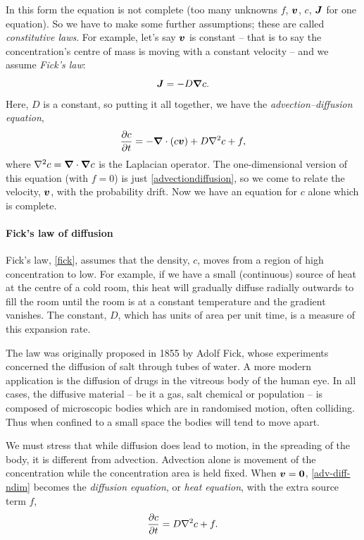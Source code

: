 \documentclass[main.tex]{subfiles}
\begin{document}
In this form the equation is not complete (too many unknowns $f$, $\v{v}$, $c$, $\v{J}$ for one equation). So we have to make some further assumptions; these are called \emph{constitutive laws}. For example, let's say $\v{v}$ is constant -- that is to say the concentration's centre of mass is moving with a constant velocity -- and we assume \emph{Fick's law}:
\begin{equation}
\label{fick}
\v{J} = -D\vgrad c.
\end{equation}
Here, $D$ is a constant, so putting it all together, we have the \emph{advection--diffusion equation},
\begin{equation}
\pd{c}{t} = -\vgrad\cdot(c\v{v})  + D\nabla^2 c + f,
\label{adv-diff-ndim}
\end{equation}
where $\nabla^2 c = \boldsymbol{\nabla} \cdot \boldsymbol{\nabla} c$ is the Laplacian operator. The one-dimensional version of this equation (with $f=0$) is just \cref{advectiondiffusion}, so we come to relate the velocity, $\v{v}$, with the probability drift. Now we have an equation for $c$ alone which is complete.

\begin{info}
\paragraph{Fick's law of diffusion} 
Fick's law, \cref{fick}, assumes that the density, $c$, moves from a region of high concentration to low. For example, if we have a small (continuous) source of heat at the centre of a cold room, this heat will gradually diffuse radially outwards to fill the room until the room is at a constant temperature and the gradient vanishes. The constant, $D$, which has units of area per unit time, is a measure of this expansion rate. 

The law was originally proposed in 1855 by Adolf Fick, whose experiments concerned the diffusion of salt through tubes of water. A more modern application is the diffusion of drugs in the vitreous body of the human eye. In all cases, the diffusive material -- be it a gas, salt chemical or population -- is composed of microscopic bodies which are in randomised motion, often colliding. Thus when confined to a small space the bodies will tend to move apart. 
\end{info}

We must stress that while diffusion does lead to motion, in the spreading of the body, it is different from advection. Advection alone is movement of the concentration while the concentration area is held fixed. When $\v{v}=\vu{0}$, \cref{adv-diff-ndim} becomes the \emph{diffusion equation}, or \emph{heat equation}, with the extra source term $f$,
\begin{equation}
	\pd{c}{t} = D\nabla^2 c + f.
\end{equation}
\end{document}

